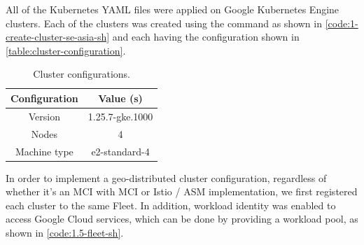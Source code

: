 All of the Kubernetes YAML files were applied on Google Kubernetes Engine clusters. Each of the clusters was created using the  command as shown in \autoref{code:1-create-cluster-se-asia-sh} and each having the configuration shown in \autoref{table:cluster-configuration}.

\vspace{\baselineskip}
% 
\noindent
\begin{minipage}{\linewidth}

\end{minipage}

\begin{table}
	\centering
        \caption{Cluster configurations.}
	\begin{tabular}{|c|c|}
		\hline
		Configuration   & Value (s) \\ \hline
            Version & 1.25.7-gke.1000 \\ \hline
            Nodes & 4 \\ \hline
            Machine type & e2-standard-4 \\ \hline
	\end{tabular}
	\label{table:cluster-configuration}
\end{table}

In order to implement a geo-distributed cluster configuration, regardless of whether it's an MCI with MCI or Istio / ASM implementation, we first registered each cluster to the same Fleet. In addition, workload identity was enabled to access Google Cloud services, which can be done by providing a workload pool, as shown in \autoref{code:1.5-fleet-sh}.

\vspace{\baselineskip}
\noindent
\begin{minipage}{\linewidth}
% 

\end{minipage}

